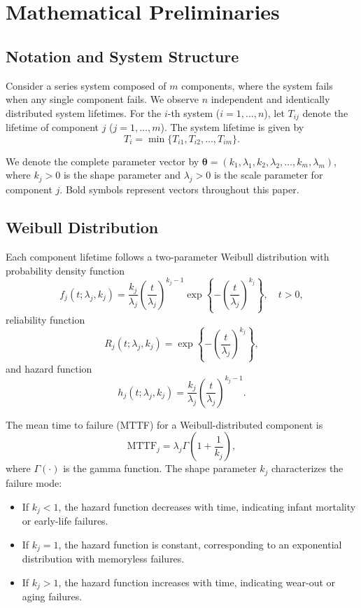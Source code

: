 \documentclass[11pt]{article}
\renewcommand{\v}[1]{\boldsymbol{#1}}
\begin{document}
\section{Mathematical Preliminaries}

\subsection{Notation and System Structure}

Consider a series system composed of $m$ components, where the system fails when any single component fails. We observe $n$ independent and identically distributed system lifetimes. For the $i$-th system ($i = 1, \ldots, n$), let $T_{ij}$ denote the lifetime of component $j$ ($j = 1, \ldots, m$). The system lifetime is given by
\begin{equation}
T_i = \min\{T_{i1}, T_{i2}, \ldots, T_{im}\}.
\end{equation}

We denote the complete parameter vector by $\v\theta = (k_1, \lambda_1, k_2, \lambda_2, \ldots, k_m, \lambda_m)$, where $k_j > 0$ is the shape parameter and $\lambda_j > 0$ is the scale parameter for component $j$. Bold symbols represent vectors throughout this paper.

\subsection{Weibull Distribution}

Each component lifetime follows a two-parameter Weibull distribution with probability density function
\begin{equation}
f_j(t; \lambda_j, k_j) = \frac{k_j}{\lambda_j}\left(\frac{t}{\lambda_j}\right)^{k_j-1} \exp\left\{-\left(\frac{t}{\lambda_j}\right)^{k_j}\right\}, \quad t > 0,
\end{equation}
reliability function
\begin{equation}
R_j(t; \lambda_j, k_j) = \exp\left\{-\left(\frac{t}{\lambda_j}\right)^{k_j}\right\},
\end{equation}
and hazard function
\begin{equation}
h_j(t; \lambda_j, k_j) = \frac{k_j}{\lambda_j}\left(\frac{t}{\lambda_j}\right)^{k_j-1}.
\end{equation}

The mean time to failure (MTTF) for a Weibull-distributed component is
\begin{equation}
\label{eq:mttf-weibull}
\text{MTTF}_j = \lambda_j \Gamma\left(1 + \frac{1}{k_j}\right),
\end{equation}
where $\Gamma(\cdot)$ is the gamma function. The shape parameter $k_j$ characterizes the failure mode:
\begin{itemize}
\item If $k_j < 1$, the hazard function decreases with time, indicating infant mortality or early-life failures.
\item If $k_j = 1$, the hazard function is constant, corresponding to an exponential distribution with memoryless failures.
\item If $k_j > 1$, the hazard function increases with time, indicating wear-out or aging failures.
\end{itemize}
\end{document}

